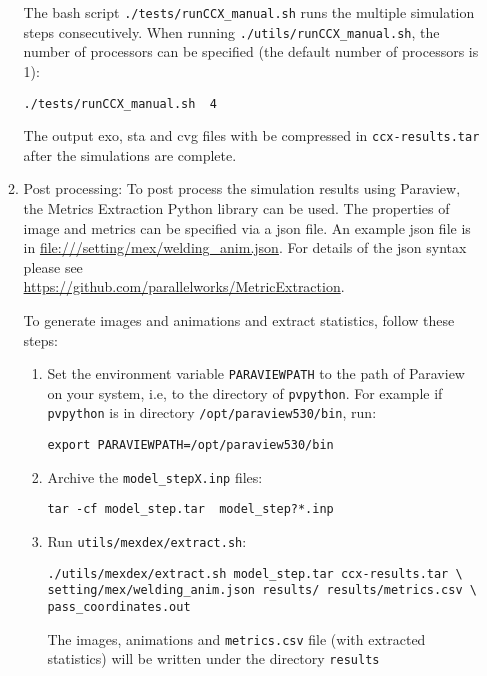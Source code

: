 \documentclass[12pt,letterpaper]{article}
\newcommand{\verbStyle}[1]{{\color{SteelBlue40}\colorbox{LightSteelBlue10}{{#1}}}}
\let\OldTexttt\texttt
\renewcommand{\texttt}[1]{\OldTexttt{\verbStyle{#1}}}
\begin{document}
\begin{itemize}
\begin{enumerate}
The bash script \texttt{./tests/runCCX\_manual.sh} runs the multiple simulation steps 
consecutively. When running \texttt{./utils/runCCX\_manual.sh}, the number of processors can be specified
(the default number of processors is 1):
\begin{verbatim}
./tests/runCCX_manual.sh  4
\end{verbatim}
The output exo, sta and cvg files with be compressed in \texttt{ccx-results.tar} after the simulations
are complete.
\item Post processing: 
To post process the simulation results using Paraview, the Metrics Extraction Python 
library can be used. The properties of image and metrics can be specified via a json file.
An example json file is in \url{file:///setting/mex/welding_anim.json}. 
For details of the json syntax please see \\
\url{https://github.com/parallelworks/MetricExtraction}. 

To generate images and animations and extract statistics, follow these steps:
\begin{enumerate}
\item Set the environment variable \texttt{PARAVIEWPATH} to the path of Paraview on your system, i.e, 
to the directory of \texttt{pvpython}. For example if \texttt{pvpython} is in directory \texttt{/opt/paraview530/bin}, run:
\begin{verbatim}
export PARAVIEWPATH=/opt/paraview530/bin
\end{verbatim}
\item Archive the \texttt{model\_stepX.inp} files: 
\begin{verbatim}
tar -cf model_step.tar  model_step?*.inp
\end{verbatim}
\item Run \texttt{utils/mexdex/extract.sh}: 
\begin{verbatim}
./utils/mexdex/extract.sh model_step.tar ccx-results.tar \
setting/mex/welding_anim.json results/ results/metrics.csv \
pass_coordinates.out
\end{verbatim}
The images, animations and \texttt{metrics.csv} file (with extracted statistics) will be written under the directory \texttt{results}
\end{enumerate}
\end{enumerate}
\end{itemize}
\end{document}
